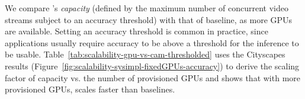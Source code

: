 


We compare \name's {\em capacity} (defined by the maximum number of concurrent video streams subject to an accuracy threshold) with that of \fair baseline, as more GPUs are available.
Setting an accuracy threshold is common in practice, since applications usually require accuracy to be above a threshold for the inference to be usable.
Table~\ref{tab:scalability-gpu-vs-cam-thresholded} uses the Cityscapes results (Figure~\ref{fig:scalability-sysimpl-fixedGPUs-accuracy}) to derive the scaling factor of capacity vs. the number of provisioned GPUs and shows that with more provisioned GPUs, \name scales faster than \fair baselines.






